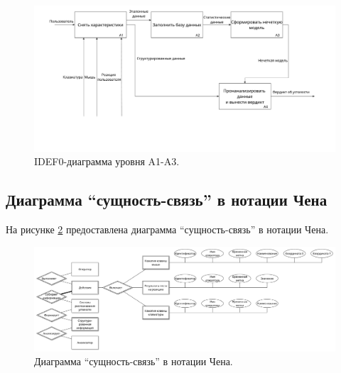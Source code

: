 \begin{figure}[H]
	\centering
	\includegraphics[scale=0.28]{img/A123.pdf}
	\caption{IDEF0-диаграмма уровня A1-A3.}
	\label{fig:idef:1}
\end{figure}

\subsection{Диаграмма ``сущность-связь'' в нотации Чена}
На рисунке \ref{fig:erDiag} предоставлена диаграмма ``сущность-связь'' в нотации Чена.

\begin{figure}[H]
	\centering
	\includegraphics[scale=0.28]{img/chenERDiagram.pdf}
	\caption{Диаграмма ``сущность-связь'' в нотации Чена.}
	\label{fig:erDiag}
\end{figure}

